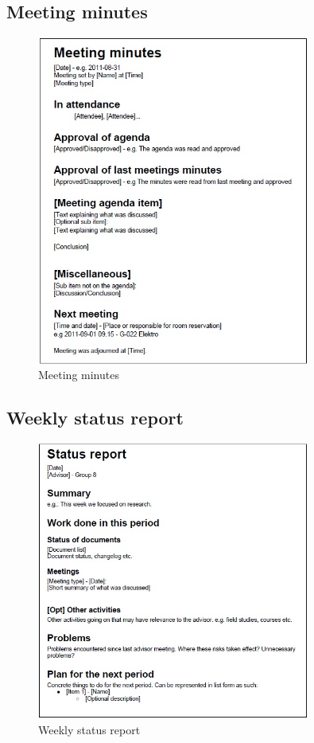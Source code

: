 	\subsection{Meeting minutes}
		\begin{figure}[htb]
			\centering
			\includegraphics[width=0.8\textwidth]{appendix/meeting_minutes.jpg}
			\caption{Meeting minutes}
			\label{fig:meeting-minutes}
		\end{figure}
	
	\newpage
	\subsection{Weekly status report}
		\begin{figure}[htb]
			\centering
			\includegraphics[width=0.8\textwidth]{appendix/weekly_status_report.jpg}
			\caption{Weekly status report}
			\label{fig:weekly-status-report}
		\end{figure}

